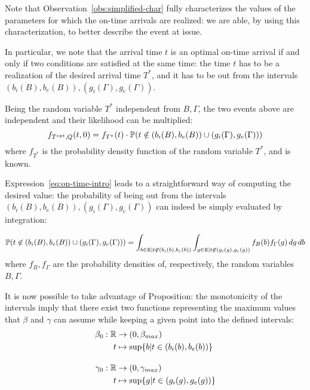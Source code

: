 Note that Observation~\ref{obs:simplified-char} fully characterizes the values of the parameters for which the on-time arrivals are realized:
we are able, by using this characterization, to better describe the event at issue.

In particular, we note that the arrival time \(t\) is an optimal on-time arrival if and only if two conditions are satisfied at the same time:
the time \(t\) has to be a realization of the desired arrival time \(T^*\),
and it has to  be out from the intervals \((b_i(B), b_e(B)), (g_i(\Gamma), g_e(\Gamma))\).

Being the random variable \(T^*\) independent from \(B, \Gamma\),
the two events above are independent and their likelihood can be multiplied:
\begin{equation}
  \label{eq:on-time-intro}
  f_{T^{opt}, Q}(t, 0) = f_{T^*}(t) \cdot \mathbb{P}(t \notin (b_i(B), b_e(B)) \cup (g_i(\Gamma), g_e(\Gamma)))
\end{equation}
where \(f_{T^*}\) is the probability density function of the random variable \(T^*\), and is known.

Expression~\eqref{eq:on-time-intro} leads to a straightforward way of computing the desired value:
the probability of being out from the intervals \((b_i(B), b_e(B)), (g_i(\Gamma), g_e(\Gamma))\) can indeed be simply evaluated by integration:

\begin{equation}
  \label{eq:prob-not-intervals}
  \mathbb{P}( t \not\in (b_i(B), b_e(B)) \cup (g_i(\Gamma), g_e(\Gamma))) = \int_{b\in \mathbb{R} \vert t \not\in (b_i(b), b_e(b))}\int_{g \in \mathbb{R} \vert t \not\in (g_i(g), g_e(g))}f_B(b)f_\Gamma(g)\, dg\, db
\end{equation}
where \(f_B, f_\Gamma\) are the probability densities of, respectively, the random variables \(B, \Gamma\).


It is now possible to take advantage of Proposition:
the monotonicity of the intervals imply that there exist two functions representing the maximum values that \(\beta\) and \(\gamma\) can assume while keeping a given point into the defined intervals:
\begin{equation}
  \label{eq:def_b_0_g_0}
  \begin{split}
    \beta_0:\mathbb{R}&\rightarrow(0, \beta_{max}) \\
    t&\mapsto \sup\{b | t \in (b_i(b), b_e(b))\} \\[1em]
    \gamma_0:\mathbb{R}&\rightarrow(0, \gamma_{max}) \\
    t&\mapsto \sup\{g | t \in (g_i(g), g_e(g))\}
  \end{split}
\end{equation}


